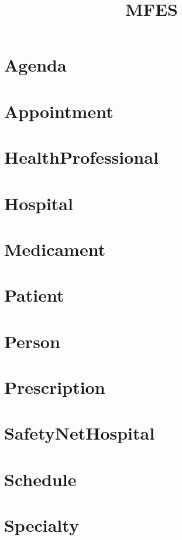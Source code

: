 \documentclass{article}
\begin{document}
\title{MFES}
\author{}
\maketitle
\tableofcontents

\section{Agenda}

\section{Appointment}

\section{HealthProfessional}

\section{Hospital}

\section{Medicament}

\section{Patient}

\section{Person}

\section{Prescription}

\section{SafetyNetHospital}

\section{Schedule}

\section{Specialty}

\end{document}
